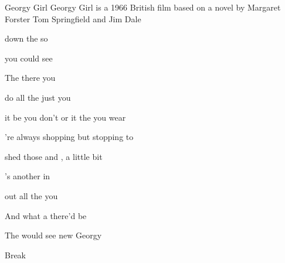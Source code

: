 \begin{SBSong}{Georgy Girl}
  {Georgy Girl is a 1966 British film based on a novel by Margaret Forster}
  {Tom Springfield and Jim Dale}
  \begin{SBVerse}  
	     
	
	 down the  so    
	
	 you  could  see 
 
	The  there   you
  
	     
	
	 do all the  just  you  
 
	 it be you  don't  or  it the  you wear 
	
	're always  shopping but  stopping to   
	
	 shed those   and ,  a little bit  
  \end{SBVerse}
  \begin{SBVerse}
	    
	
	's another   in
	
	 out all the  you  
	
	And  what a  there'd be 
	
	The  would see   new Georgy     
  \end{SBVerse}
  
  \begin{SBBracket}{Break}
    

\end{SBBracket}
\end{SBSong}
